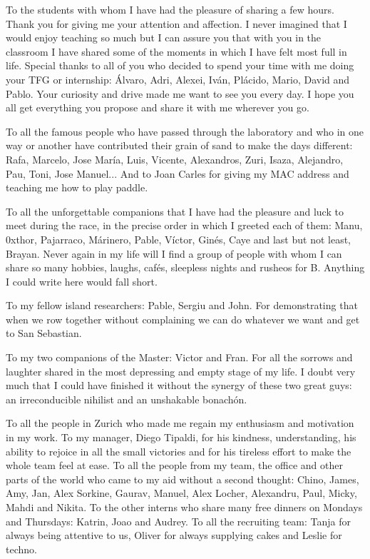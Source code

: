 To the students with whom I have had the pleasure of sharing a few hours. Thank you for giving me your attention and affection. I never imagined that I would enjoy teaching so much but I can assure you that with you in the classroom I have shared some of the moments in which I have felt most full in life. Special thanks to all of you who decided to spend your time with me doing your TFG or internship: Álvaro, Adri, Alexei, Iván, Plácido, Mario, David and Pablo. Your curiosity and drive made me want to see you every day. I hope you all get everything you propose and share it with me wherever you go.

To all the famous people who have passed through the laboratory and who in one way or another have contributed their grain of sand to make the days different: Rafa, Marcelo, Jose María, Luis, Vicente, Alexandros, Zuri, Isaza, Alejandro, Pau, Toni, Jose Manuel... And to Joan Carles for giving my MAC address and teaching me how to play paddle.

To all the unforgettable companions that I have had the pleasure and luck to meet during the race, in the precise order in which I greeted each of them: Manu, 0xthor, Pajarraco, Márinero, Pable, Víctor, Ginés, Caye and last but not least, Brayan. Never again in my life will I find a group of people with whom I can share so many hobbies, laughs, cafés, sleepless nights and rusheos for B. Anything I could write here would fall short.

To my fellow island researchers: Pable, Sergiu and John. For demonstrating that when we row together without complaining we can do whatever we want and get to San Sebastian.

To my two companions of the Master: Victor and Fran. For all the sorrows and laughter shared in the most depressing and empty stage of my life. I doubt very much that I could have finished it without the synergy of these two great guys: an irreconducible nihilist and an unshakable bonachón.

To all the people in Zurich who made me regain my enthusiasm and motivation in my work. To my manager, Diego Tipaldi, for his kindness, understanding, his ability to rejoice in all the small victories and for his tireless effort to make the whole team feel at ease. To all the people from my team, the office and other parts of the world who came to my aid without a second thought: Chino, James, Amy, Jan, Alex Sorkine, Gaurav, Manuel, Alex Locher, Alexandru, Paul, Micky, Mahdi and Nikita. To the other interns who share many free dinners on Mondays and Thursdays: Katrin, Joao and Audrey. To all the recruiting team: Tanja for always being attentive to us, Oliver for always supplying cakes and Leslie for techno.

